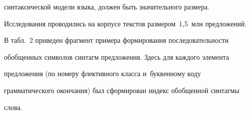 синтаксической модели языка, \mbox{должен} быть значительного размера. 

Исследования проводились на корпусе текстов размером~1,5~млн предложений.



\renewcommand{\figurename}{\protect\bf Рис.}

\renewcommand{\tablename}{\protect\bf Таблица}





  

  В табл.~2 приведен фрагмент примера формирования последовательности 

обобщенных символов синтагм предложения. Здесь для каждого элемента 

предложения (по номеру флективного класса и~буквенному коду 

грамматического окончания) был сформирован индекс обобщенной синтагмы 

слова. 

\setcounter{table}{1}

